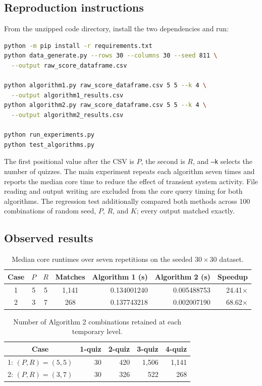 \documentclass[11pt]{article}
\begin{document}
\subsection{Reproduction instructions}
From the unzipped code directory, install the two dependencies and run:

\begin{lstlisting}[language=bash]
python -m pip install -r requirements.txt
python data_generate.py --rows 30 --columns 30 --seed 811 \
  --output raw_score_dataframe.csv

python algorithm1.py raw_score_dataframe.csv 5 5 --k 4 \
  --output algorithm1_results.csv
python algorithm2.py raw_score_dataframe.csv 5 5 --k 4 \
  --output algorithm2_results.csv

python run_experiments.py
python test_algorithms.py
\end{lstlisting}

The first positional value after the CSV is $P$, the second is $R$, and \texttt{--k} selects the number of quizzes. The main experiment repeats each algorithm seven times and reports the median core time to reduce the effect of transient system activity. File reading and output writing are excluded from the core query timing for both algorithms. The regression test additionally compared both methods across 100 combinations of random seed, $P$, $R$, and $K$; every output matched exactly.

\subsection{Observed results}
\begin{table}[H]
\centering
\caption{Median core runtimes over seven repetitions on the seeded $30\times30$ dataset.}
\begin{tabular}{ccccrrr}
\toprule
Case & $P$ & $R$ & Matches & Algorithm 1 (s) & Algorithm 2 (s) & Speedup \\
\midrule
1 & 5 & 5 & 1,141 & 0.134001240 & 0.005488753 & 24.41$\times$ \\
2 & 3 & 7 & 268 & 0.137743218 & 0.002007190 & 68.62$\times$ \\
\bottomrule
\end{tabular}
\end{table}

\begin{table}[H]
\centering
\caption{Number of Algorithm 2 combinations retained at each temporary level.}
\begin{tabular}{crrrr}
\toprule
Case & 1-quiz & 2-quiz & 3-quiz & 4-quiz \\
\midrule
1: $(P,R)=(5,5)$ & 30 & 420 & 1,506 & 1,141 \\
2: $(P,R)=(3,7)$ & 30 & 326 & 522 & 268 \\
\bottomrule
\end{tabular}
\end{table}
\end{document}
